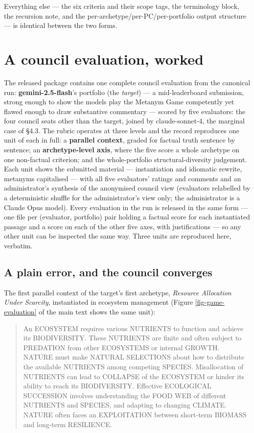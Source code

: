 \documentclass{article}
\begin{document}
Everything else --- the six criteria and their scope tags, the terminology block, the recursion note, and the per-archetype/per-PC/per-portfolio output structure --- is identical between the two forms.

\section{A council evaluation, worked}\label{a-council-evaluation-worked}

The released package contains one complete council evaluation from the canonical run: \textbf{gemini-2.5-flash}'s portfolio (the \emph{target}) --- a mid-leaderboard submission, strong enough to show the models play the Metanym Game competently yet flawed enough to draw substantive commentary --- scored by five evaluators: the four council seats other than the target, joined by claude-sonnet-4, the marginal case of \S{}4.3. The rubric operates at three levels and the record reproduces one unit of each in full: a \textbf{parallel context}, graded for factual truth sentence by sentence; an \textbf{archetype-level axis}, where the five score a whole archetype on one non-factual criterion; and the whole-portfolio structural-diversity judgement. Each unit shows the submitted material --- instantiation and idiomatic rewrite, metanyms capitalised --- with all five evaluators' ratings and comments and an administrator's synthesis of the anonymised council view (evaluators relabelled by a deterministic shuffle for the administrator's view only; the administrator is a Claude Opus model). Every evaluation in the run is released in the same form --- one file per (evaluator, portfolio) pair holding a factual score for each instantiated passage and a score on each of the other five axes, with justifications --- so any other unit can be inspected the same way. Three units are reproduced here, verbatim.

\subsection{A plain error, and the council converges}\label{a-plain-error-and-the-council-converges}

The first parallel context of the target's first archetype, \emph{Resource Allocation Under Scarcity}, instantiated in ecosystem management (Figure \ref{fig-game-evaluation} of the main text shows the same unit):

\begin{quote}
An ECOSYSTEM requires various NUTRIENTS to function and achieve its BIODIVERSITY. These NUTRIENTS are finite and often subject to PREDATION from other ECOSYSTEMS or internal GROWTH. NATURE must make NATURAL SELECTIONS about how to distribute the available NUTRIENTS among competing SPECIES. Misallocation of NUTRIENTS can lead to COLLAPSE of the ECOSYSTEM or hinder its ability to reach its BIODIVERSITY. Effective ECOLOGICAL SUCCESSION involves understanding the FOOD WEB of different NUTRIENTS and SPECIES, and adapting to changing CLIMATE. NATURE often faces an EXPLOITATION between short-term BIOMASS and long-term RESILIENCE.
\end{quote}
\end{document}
